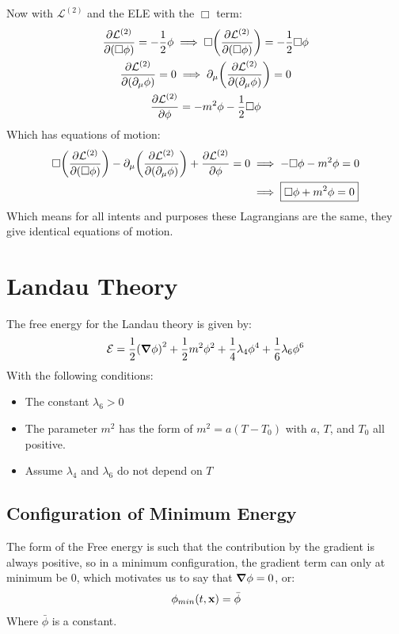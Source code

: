\documentclass[12pt]{article}
\renewcommand{\L}{\mathcal{L}}
\newcommand{\D}{\partial}
\begin{document}
Now with $\L^{(2)}$ and the ELE with the $\Box$ term:
\begin{gather*}
  \pdv{\L^{(2)}}{(\Box\phi)}=-\frac12\phi\implies
  \Box\qty(\pdv{\L^{(2)}}{(\Box\phi)})=-\frac12\Box\phi\\
  \pdv{\L^{(2)}}{(\D_\mu\phi)}=0\implies
  \D_\mu\qty(\pdv{\L^{(2)}}{(\D_\mu\phi)})=0\\
  \pdv{\L^{(2)}}{\phi}=-m^2\phi-\frac12\Box\phi
\end{gather*}
Which has equations of motion:
\begin{align}
  \Box\qty(\pdv{\L^{(2)}}{(\Box\phi)})-\D_\mu\qty(\pdv{\L^{(2)}}{(\D_\mu\phi)})
  +\pdv{\L^{(2)}}{\phi}=0&\implies-\Box\phi-m^2\phi=0\nonumber\\
  &\implies\boxed{\Box\phi+m^2\phi=0}
\end{align}
Which means for all intents and purposes these Lagrangians are the same, they give identical equations of motion.
\section{Landau Theory}
The free energy for the Landau theory is given by:
\begin{align*}
  \mathcal{E}=\frac12\qty(\grad{\phi})^2+\frac12m^2\phi^2
  +\frac14\lambda_4\phi^4+\frac16\lambda_6\phi^6
\end{align*}
With the following conditions:
\begin{itemize}
\item The constant $\lambda_6>0$
\item The parameter $m^2$ has the form of $m^2=a(T-T_0)$ with $a$, $T$, and $T_0$ all positive. 
\item Assume $\lambda_4$ and $\lambda_6$ do not depend on $T$
\end{itemize}

\subsection{Configuration of Minimum Energy}
The form of the Free energy is such that the contribution by the gradient is always positive, so in a minimum configuration, the gradient term can only at minimum be $0$, which motivates us to say that $\grad{\phi}=0$, or:
\begin{align*}
  \phi_{min}(t,\vb{x})=\bar{\phi}
\end{align*}
Where $\bar{\phi}$ is a constant.
\end{document}

